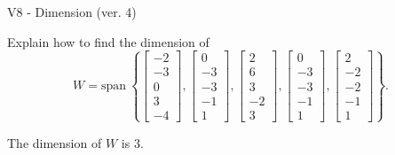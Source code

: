 \begin{exercise}
  \begin{exerciseTitle}V8 - Dimension (ver. 4)\end{exerciseTitle}
  \begin{exerciseStatement}
    Explain how to find the dimension of 
\[W=\mathrm{span}\ \left\{\left[\begin{array}{r}
-2 \\
-3 \\
0 \\
3 \\
-4
\end{array}\right] , \left[\begin{array}{r}
0 \\
-3 \\
-3 \\
-1 \\
1
\end{array}\right] , \left[\begin{array}{r}
2 \\
6 \\
3 \\
-2 \\
3
\end{array}\right] , \left[\begin{array}{r}
0 \\
-3 \\
-3 \\
-1 \\
1
\end{array}\right] , \left[\begin{array}{r}
2 \\
-2 \\
-2 \\
-1 \\
1
\end{array}\right]\right\}.\]



  \end{exerciseStatement}
  \begin{exerciseAnswer}
   The dimension of \(W\) is  \(3\).
  


  \end{exerciseAnswer}
\end{exercise}